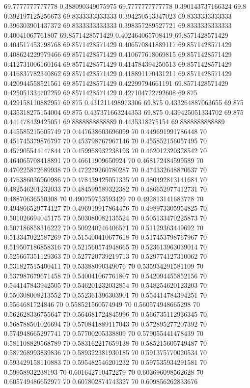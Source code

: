 {69.7777777777778 0.388090349075975
69.7777777777778 0.390143737166324
69.8 0.392197125256673
69.8333333333333 0.394250513347023
69.8333333333333 0.396303901437372
69.8333333333333 0.398357289527721
69.8333333333333 0.40041067761807
69.8571428571429 0.402464065708419
69.8571428571429 0.404517453798768
69.8571428571429 0.406570841889117
69.8571428571429 0.408624229979466
69.8571428571429 0.410677618069815
69.8571428571429 0.412731006160164
69.8571428571429 0.414784394250513
69.8571428571429 0.416837782340862
69.8571428571429 0.418891170431211
69.8571428571429 0.420944558521561
69.8571428571429 0.42299794661191
69.8571428571429 0.425051334702259
69.8571428571429 0.427104722792608
69.875 0.429158110882957
69.875 0.431211498973306
69.875 0.433264887063655
69.875 0.435318275154004
69.875 0.437371663244353
69.875 0.439425051334702
69.875 0.441478439425051
69.8888888888889 0.4435318275154
69.8888888888889 0.445585215605749
70 0.447638603696099
70 0.449691991786448
70 0.451745379876797
70 0.453798767967146
70 0.455852156057495
70 0.457905544147844
70 0.459958932238193
70 0.462012320328542
70 0.464065708418891
70 0.46611909650924
70 0.468172484599589
70 0.470225872689938
70 0.472279260780287
70 0.474332648870637
70 0.476386036960986
70 0.478439425051335
70 0.480492813141684
70 0.482546201232033
70 0.484599589322382
70 0.486652977412731
70 0.48870636550308
70 0.490759753593429
70 0.492813141683778
70 0.494866529774127
70 0.496919917864476
70 0.498973305954825
70 0.501026694045175
70 0.503080082135524
70 0.505133470225873
70 0.507186858316222
70 0.509240246406571
70 0.51129363449692
70 0.513347022587269
70 0.515400410677618
70 0.517453798767967
70 0.519507186858316
70 0.521560574948665
70 0.523613963039014
70 0.525667351129363
70 0.527720739219713
70 0.529774127310062
70 0.531827515400411
70 0.53388090349076
70 0.535934291581109
70 0.537987679671458
70 0.540041067761807
70 0.542094455852156
70 0.544147843942505
70 0.546201232032854
70 0.548254620123203
70 0.550308008213552
70 0.552361396303901
70 0.554414784394251
70 0.5564681724846
70 0.558521560574949
70 0.560574948665298
70 0.562628336755647
70 0.564681724845996
70 0.566735112936345
70 0.568788501026694
70 0.570841889117043
70 0.572895277207392
70 0.574948665297741
70 0.57700205338809
70 0.579055441478439
70 0.581108829568789
70 0.583162217659138
70 0.585215605749487
70 0.587268993839836
70 0.589322381930185
70 0.591375770020534
70 0.593429158110883
70 0.595482546201232
70 0.597535934291581
70 0.59958932238193
70 0.601642710472279
70 0.603696098562628
70 0.605749486652977
70 0.607802874743327
70 0.609856262833676
}
